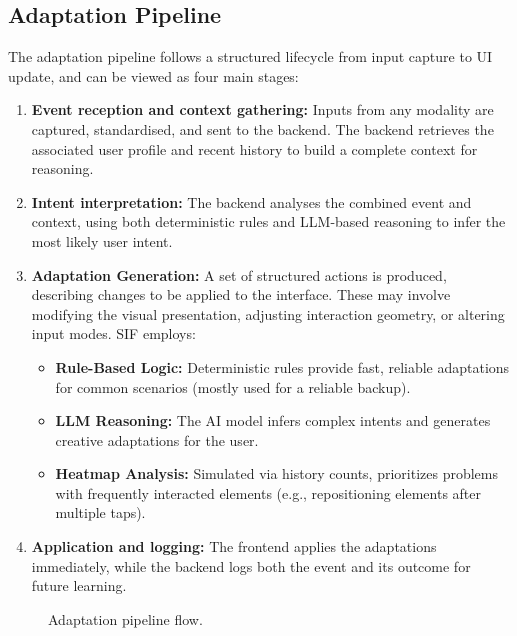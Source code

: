 \documentclass[openany]{book}
\begin{document}
\subsection{Adaptation Pipeline}
The adaptation pipeline follows a structured lifecycle from input capture to UI update, and can be viewed as four main stages:
\begin{enumerate}
    \item \textbf{Event reception and context gathering:} Inputs from any modality are captured, standardised, and sent to the backend. The backend retrieves the associated user profile and recent history to build a complete context for reasoning.
    \item \textbf{Intent interpretation:} The backend analyses the combined event and context, using both deterministic rules and LLM-based reasoning to infer the most likely user intent.
    \item \textbf{Adaptation Generation:} A set of structured actions is produced, describing changes to be applied to the interface. These may involve modifying the visual presentation, adjusting interaction geometry, or altering input modes. SIF employs:
        \begin{itemize}
            \item \textbf{Rule-Based Logic:} Deterministic rules provide fast, reliable adaptations for common scenarios (mostly used for a reliable backup).
            \item \textbf{LLM Reasoning:} The AI model infers complex intents and generates creative adaptations for the user.
            \item \textbf{Heatmap Analysis:} Simulated via history counts, prioritizes problems with frequently interacted elements (e.g., repositioning elements after multiple taps).
        \end{itemize}
    \item \textbf{Application and logging:} The frontend applies the adaptations immediately, while the backend logs both the event and its outcome for future learning.
\end{enumerate}

\begin{figure}[h]
\centering
{}
\caption{Adaptation pipeline flow.}
\label{fig:adaptation-pipeline-flow}
\end{figure}
\end{document}
